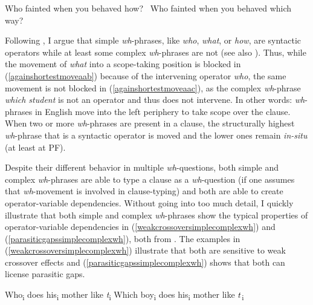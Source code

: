 \begin{exe}
\ex\label{againshortestmovea}\begin{xlist}
\ex *Who fainted when you behaved how? \label{againshortestmoveaa}
\ex \textcolor{white}{*}Who fainted when you behaved which way? \label{againshortestmoveab}
\end{xlist}
\end{exe}

\noindent Following \citet{van2010complex}, I argue that simple \textit{wh}-phrases, like \textit{who}, \textit{what}, or \textit{how}, are syntactic operators while at least some complex \textit{wh}-phrases are not (see also \citealt{cinque1986bare, pesetsky1987wh, dobrovie1990clitic, grewendorf2012wh}). Thus, while the movement of \textit{what} into a scope-taking position is blocked in (\ref{againshortestmoveaab}) because of the intervening operator \textit{who}, the same movement is not blocked in (\ref{againshortestmoveaac}), as the complex \textit{wh}-phrase \textit{which student} is not an operator and thus does not intervene. In other words: \textit{wh}-phrases in English move into the left periphery to take scope over the clause. When two or more \textit{wh}-phrases are present in a clause, the structurally highest \textit{wh}-phrase that is a syntactic operator is moved and the lower ones remain \textit{in-situ} (at least at PF).  

Despite their different behavior in multiple \textit{wh}-questions, both simple and complex \textit{wh}-phrases are able to type a clause as a \textit{wh}-question (if one assumes that \textit{wh}-movement is involved in clause-typing) and both are able to create operator-variable dependencies. Without going into too much detail, I quickly illustrate that both simple and complex \textit{wh}-phrases show the typical properties of operator-variable dependencies in (\ref{weakcrossoversimplecomplexwh}) and (\ref{parasiticgapssimplecomplexwh}), both from \citet[240]{van2010complex}. The examples in (\ref{weakcrossoversimplecomplexwh}) illustrate that both are sensitive to weak crossover effects and (\ref{parasiticgapssimplecomplexwh}) shows that both can license parasitic gaps.

\begin{exe}
\ex\label{weakcrossoversimplecomplexwh}\begin{xlist}
\ex *Who\textsubscript{i} does his\textsubscript{i} mother like \textit{t}\textsubscript{i} \label{weakcrossoversimplecomplexwha}
\ex *Which boy\textsubscript{i} does his\textsubscript{i} mother like $\textrm{\textit{t}}$\textsubscript{i} \label{weakcrossoversimplecomplexwhb}
\end{xlist}
\end{exe}

